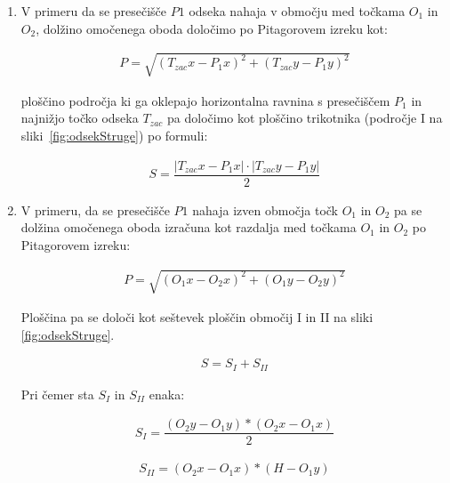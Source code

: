 \begin{enumerate}
	\item V primeru da se presečišče $P1$ odseka nahaja v območju med točkama $O_1$ in $O_2$, dolžino omočenega oboda določimo po Pitagorovem izreku kot:
	
	
	\begin{ceqn}
		\begin{align}
		P = \sqrt{(T_{zac}x - P_1x)^{2} + (T_{zac}y - P_1y)^{2}}
		\end{align}
	\end{ceqn}
	
	
	ploščino področja ki ga oklepajo horizontalna ravnina s presečiščem $P_1$ in najnižjo točko odseka $T_{zac}$ pa določimo kot ploščino trikotnika (področje I na sliki~\ref{fig:odsekStruge}) po formuli:
	
	\begin{ceqn}
	\begin{align}
	S = \dfrac{|T_{zac}x - P_1x| \cdot |T_{zac}y - P_1y|}{2}
	\end{align}
	\end{ceqn}
	
	
	\item V primeru, da se presečišče $P1$ nahaja izven območja točk $O_1$ in $O_2$ pa se dolžina omočenega oboda izračuna kot razdalja med točkama $O_1$ in $O_2$ po Pitagorovem izreku:
	
	\begin{ceqn}
	\begin{align}
	P = \sqrt{ (O_1x - O_2x)^{2} + (O_1y - O_2y)^{2}}
	\end{align}
	\end{ceqn}
	
	Ploščina pa se določi kot seštevek ploščin območij I in II na sliki \ref{fig:odsekStruge}.
	
	\begin{ceqn}
	\begin{align}
	S = S_I + S_{II}
	\end{align}
	\end{ceqn}
	
	Pri čemer sta $S_I$ in $S_{II}$ enaka:
	

	\begin{ceqn}
	\begin{align}
	S_I =\dfrac{ (O_2y - O_1y) *  (O_2x - O_1x)}{2}
	\end{align}
	
	\begin{align}
	S_{II} = (O_2x - O_1x) * (H - O_1y)
	\end{align}
	\end{ceqn}

	
	
	
	
\end{enumerate}


